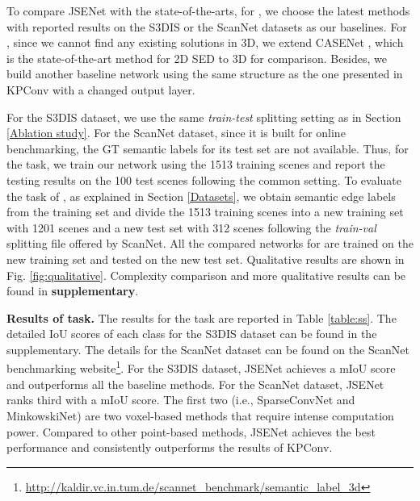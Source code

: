 \documentclass[runningheads]{llncs}
\begin{document}
To compare JSENet with the state-of-the-arts, for {\SemSeg}, we choose the latest methods {\cite{li2018pointcnn,jaritz2019multi,qi2017pointnet,jiang2019hierarchical,Choy_2019,tchapmi2017segcloud,tatarchenko2018tangent,ye20183d,landrieu2018large,rethage2018fully,wang2018deep,narita2019panopticfusion,huang2019texturenet,lei2019spherical,hermosilla2018monte,su2018splatnet,zhang2018efficient,wu2019pointconv,graham20183d}} with reported results on {the} S3DIS or the ScanNet datasets as {our} baselines.
For {\SemEdgeD}, since we cannot find any existing {solutions} in 3D, we extend CASENet \cite{yu2017casenet}, which is the state-of-the-art method {for 2D SED}
to 3D {for comparison.}
Besides, we build another baseline network using the same structure as the one presented in KPConv with a changed output layer. 


For the S3DIS dataset, we use the same \emph{train-test} splitting setting as in Section \ref{Ablation study}.
For the ScanNet dataset, since it is built for online benchmarking, the GT semantic labels for its test set are not available. Thus, for {the} {\SemSeg} task, we train our network using the 1513 training scenes and report the testing result{s} on the 100 test scenes following the common setting. To evaluate the task of {\SemEdgeD}, as explained in Section \ref{Datasets}, we obtain semantic edge labels from the training set and divide the 1513 training scenes into a new training set with 1201 scenes and a new test set with 312 scenes following the {\emph{train-val}} splitting file offered by ScanNet. All the compared networks for {\SemEdgeD} are trained on the new training set and tested on the new test set. Qualitative results are shown in Fig. \ref{fig:qualitative}. Complexity comparison and more qualitative results can be found in \textbf{supplementary}.



\smallskip \noindent \textbf{Results of {\SemSeg} task.}
The results for the {\SemSeg} task are reported in Table \ref{table:ss}. The detailed IoU scores of each class for the S3DIS dataset can be found in the supplementary. The details for the ScanNet dataset can be found on the ScanNet benchmarking website\footnote{\url{http://kaldir.vc.in.tum.de/scannet_benchmark/semantic_label_3d}}.
For the S3DIS dataset, JSENet {achieves a  mIoU score and} outperforms all the baseline methods.
For the ScanNet dataset, JSENet ranks third with a  mIoU score. The first two (i.e., SparseConvNet and MinkowskiNet) are two voxel-based methods that require intense computation power. {Compared to other point-based methods, JSENet achieves the best performance and consistently outperforms the results of KPConv.}
\end{document}
